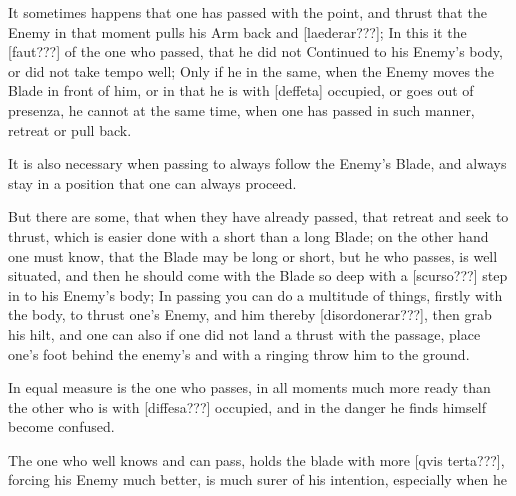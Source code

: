 It sometimes happens that one has passed with the point, and thrust
that the Enemy in that moment pulls his Arm back and [laederar???]; In
this it the [faut???] of the one who passed, that he did not Continued
to his Enemy's body, or did not take tempo well; Only if he in the
same, when the Enemy moves the Blade in front of him, or in that he is
with [deffeta] occupied, or goes out of presenza, he cannot at the
same time, when one has passed in such manner, retreat or pull back.


It is also necessary when passing to always follow the Enemy's Blade,
and always stay in a position that one can always proceed.


But there are some, that when they have already passed, that retreat
and seek to thrust, which is easier done with a
short than a long Blade; on the other hand one must know, that the
Blade may be long or short, but he who passes, is well situated, and
then he should come with the Blade so deep with a [scurso???] step in
to his Enemy's body; In passing you can do a multitude of things,
firstly with the body, to thrust one's Enemy, and him thereby
[disordonerar???], then grab his hilt, and one can also if one did not
land a thrust with the passage, place one's foot behind the enemy's
and with a ringing throw him to the ground.


In equal measure is the one who passes, in all moments much more ready
than the other who is with [diffesa???] occupied, and in the danger he
finds himself become confused.


The one who well knows and can pass, holds the blade with more [qvis
terta???], forcing his Enemy much better, is much surer of his
intention, especially when he
